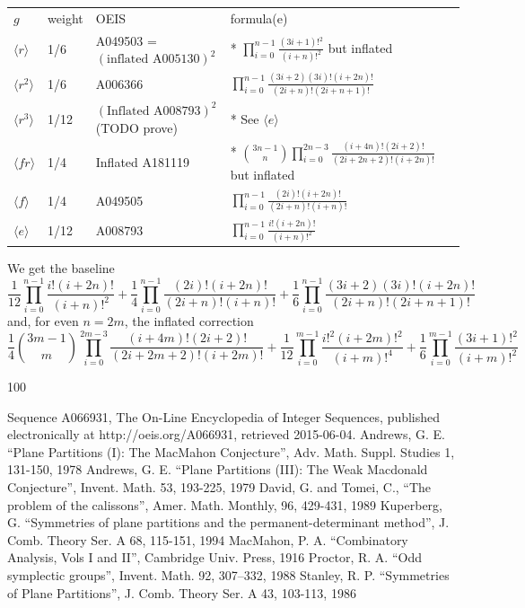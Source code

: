 \documentclass[11pt,a4paper]{article}
\theoremstyle{remark}
\begin{document}
\begin{tabular}{llll}
$g$                  & weight & OEIS & formula(e) \\
$\langle r\rangle$   & 1/6    & A049503 = $(\textrm{inflated A005130})^2$    & * $\prod_{i=0}^{n-1} \frac{(3i+1)!^2}{(i+n)!^2}$ but inflated \\
$\langle r^2\rangle$ & 1/6    & A006366                                      & $\prod_{i=0}^{n-1} \frac{(3i+2)(3i)!(i+2n)!}{(2i+n)!(2i+n+1)!}$ \\
$\langle r^3\rangle$ & 1/12   & $(\textrm{Inflated A008793})^2$ (TODO prove) & * See $\langle e\rangle$ \\
$\langle fr\rangle$  & 1/4    & Inflated A181119                             & * $\binom{3n-1}{n} \prod_{i=0}^{2n-3} \frac{(i+4n)!(2i+2)!}{(2i+2n+2)!(i+2n)!}$ but inflated \\
$\langle f\rangle$   & 1/4    & A049505                                      & $\prod_{i=0}^{n-1} \frac{(2i)!(i+2n)!}{(2i+n)!(i+n)!}$ \\
$\langle e\rangle$   & 1/12   & A008793                                      & $\prod_{i=0}^{n-1} \frac{i!(i+2n)!}{(i+n)!^2}$
\end{tabular}

\fi

We get the baseline
$$ \frac{1}{12} \prod_{i=0}^{n-1} \frac{i!(i+2n)!}{(i+n)!^2} + \frac{1}{4} \prod_{i=0}^{n-1} \frac{(2i)!(i+2n)!}{(2i+n)!(i+n)!} + \frac{1}{6} \prod_{i=0}^{n-1} \frac{(3i+2)(3i)!(i+2n)!}{(2i+n)!(2i+n+1)!} $$
and, for even $n = 2m$, the inflated correction
$$ \frac{1}{4} \binom{3m-1}{m} \prod_{i=0}^{2m-3} \frac{(i+4m)!(2i+2)!}{(2i+2m+2)!(i+2m)!} + \frac{1}{12} \prod_{i=0}^{m-1} \frac{i!^2(i+2m)!^2}{(i+m)!^4} + \frac{1}{6} \prod_{i=0}^{m-1} \frac{(3i+1)!^2}{(i+m)!^2} $$

\begin{thebibliography}{100}

 Sequence A066931, The On-Line Encyclopedia of Integer Sequences, published electronically at http://oeis.org/A066931, retrieved 2015-06-04.
 Andrews, G. E. ``Plane Partitions (I): The MacMahon Conjecture'', Adv. Math. Suppl. Studies 1, 131-150, 1978
 Andrews, G. E. ``Plane Partitions (III): The Weak Macdonald Conjecture'', Invent. Math. 53, 193-225, 1979
 David, G. and Tomei, C., ``The problem of the calissons'', Amer. Math. Monthly, 96, 429-431, 1989
 Kuperberg, G. ``Symmetries of plane partitions and the permanent-determinant method'', J. Comb. Theory Ser. A 68, 115-151, 1994
 MacMahon, P. A. ``Combinatory Analysis, Vols I and II'', Cambridge Univ. Press, 1916
 Proctor, R. A. ``Odd symplectic groups'', Invent. Math. 92, 307–332, 1988
 Stanley, R. P. ``Symmetries of Plane Partitions'', J. Comb. Theory Ser. A 43, 103-113, 1986

\end{thebibliography}
\end{document}
